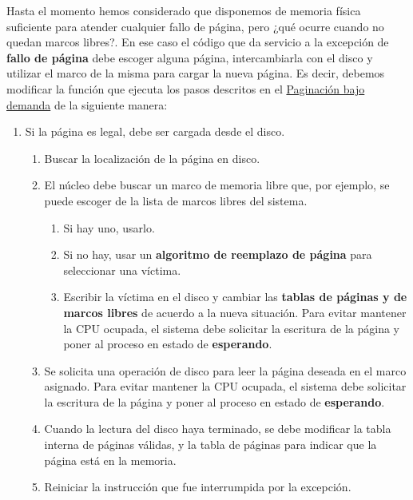 Hasta el momento hemos considerado que disponemos de memoria física
suficiente para atender cualquier fallo de página, pero ¿qué ocurre
cuando no quedan marcos libres?. En ese caso el código que da servicio a
la excepción de \textbf{fallo de página} debe escoger alguna página,
intercambiarla con el disco y utilizar el marco de la misma para cargar
la nueva página. Es decir, debemos modificar la función que ejecuta los
pasos descritos en el \hyperref[_paginaciuxf3n_bajo_demanda]{Paginación
bajo demanda} de la siguiente manera:

\begin{enumerate}
\def\labelenumi{\arabic{enumi}.}
\item
  Si la página es legal, debe ser cargada desde el disco.

  \begin{enumerate}
  \def\labelenumii{\alph{enumii}.}
  \item
    Buscar la localización de la página en disco.
  \item
    El núcleo debe buscar un marco de memoria libre que, por ejemplo, se
    puede escoger de la lista de marcos libres del sistema.

    \begin{enumerate}
    \def\labelenumiii{\roman{enumiii}.}
    \item
      Si hay uno, usarlo.
    \item
      Si no hay, usar un \textbf{algoritmo de reemplazo de página} para
      seleccionar una víctima.
    \item
      Escribir la víctima en el disco y cambiar las \textbf{tablas de
      páginas y de marcos libres} de acuerdo a la nueva situación. Para
      evitar mantener la CPU ocupada, el sistema debe solicitar la
      escritura de la página y poner al proceso en estado de
      \textbf{esperando}.
    \end{enumerate}
  \item
    Se solicita una operación de disco para leer la página deseada en el
    marco asignado. Para evitar mantener la CPU ocupada, el sistema debe
    solicitar la escritura de la página y poner al proceso en estado de
    \textbf{esperando}.
  \item
    Cuando la lectura del disco haya terminado, se debe modificar la
    tabla interna de páginas válidas, y la tabla de páginas para indicar
    que la página está en la memoria.
  \item
    Reiniciar la instrucción que fue interrumpida por la excepción.
  \end{enumerate}
\end{enumerate}

